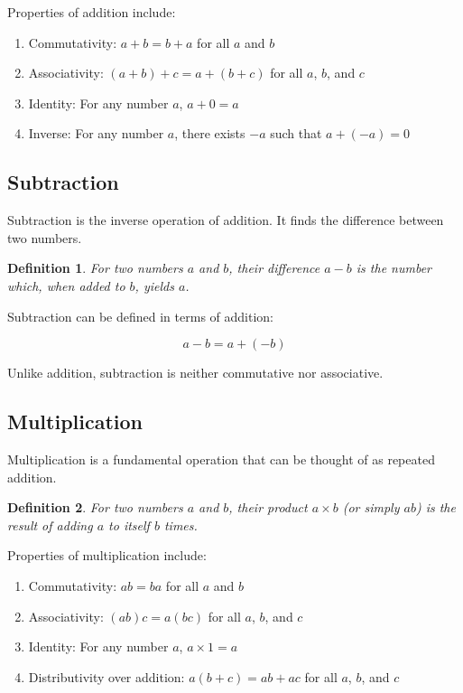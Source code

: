 \documentclass[12pt,a4paper]{article}
\newtheorem{definition}{Definition}
\begin{document}
Properties of addition include:

\begin{enumerate}
    \item Commutativity: $a + b = b + a$ for all $a$ and $b$
    \item Associativity: $(a + b) + c = a + (b + c)$ for all $a$, $b$, and $c$
    \item Identity: For any number $a$, $a + 0 = a$
    \item Inverse: For any number $a$, there exists $-a$ such that $a + (-a) = 0$
\end{enumerate}

\subsection{Subtraction}

Subtraction is the inverse operation of addition. It finds the difference between two numbers.

\begin{definition}
For two numbers $a$ and $b$, their difference $a - b$ is the number which, when added to $b$, yields $a$.
\end{definition}

Subtraction can be defined in terms of addition:

\[ a - b = a + (-b) \]

Unlike addition, subtraction is neither commutative nor associative.

\subsection{Multiplication}

Multiplication is a fundamental operation that can be thought of as repeated addition.

\begin{definition}
For two numbers $a$ and $b$, their product $a \times b$ (or simply $ab$) is the result of adding $a$ to itself $b$ times.
\end{definition}

Properties of multiplication include:

\begin{enumerate}
    \item Commutativity: $ab = ba$ for all $a$ and $b$
    \item Associativity: $(ab)c = a(bc)$ for all $a$, $b$, and $c$
    \item Identity: For any number $a$, $a \times 1 = a$
    \item Distributivity over addition: $a(b + c) = ab + ac$ for all $a$, $b$, and $c$
\end{enumerate}
\end{document}
